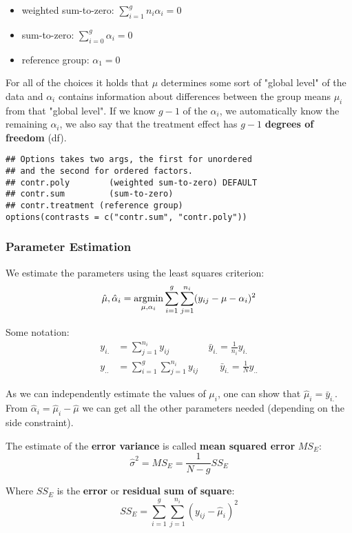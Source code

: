 \begin{itemize}
	\item weighted sum-to-zero: $\sum_{i=1}^{g} n_i \alpha_i = 0$
	\item sum-to-zero: $\sum_{i=0}^g \alpha_i = 0$
	\item reference group: $\alpha_1 = 0$
\end{itemize}

For all of the choices it holds that $\mu$ determines some sort of "global level" of the data and $\alpha_i$ contains information about differences between the group means $\mu_i$ from that "global level". If we know $g-1$ of the $\alpha_i$, we automatically know the remaining $\alpha_i$, we also say that the treatment effect has $g-1$ \textbf{degrees of freedom} (df).

\begin{lstlisting}
## Options takes two args, the first for unordered 
## and the second for ordered factors.
## contr.poly        (weighted sum-to-zero) DEFAULT
## contr.sum         (sum-to-zero)
## contr.treatment (reference group)
options(contrasts = c("contr.sum", "contr.poly"))
\end{lstlisting}

\subsubsection{Parameter Estimation}

We estimate the parameters using the least squares criterion:
$$\hat \mu, \hat \alpha_i = \underset{\mu, \alpha_i}{\text{argmin}} \sum_{i=1}^g \sum_{j=1}^{n_i}(y_{ij} - \mu - \alpha_i)^2$$

Some notation:
\begin{align*}
	y_{i.} &= \sum_{j=1}^{n_i}y_{ij} 			  \qquad \qquad  \bar y_{i.} = \frac{1}{n_i}y_{i.}\\
	y_{..} &= \sum_{i=1}^g \sum_{j=1}^{n_i}y_{ij} \qquad \ \bar y_{i.} = \frac{1}{N} y_{..}
\end{align*}

As we can independently estimate the values of $\mu_i$, one can show that $\hat \mu_i = \bar y_{i.}$. From $\hat \alpha_i = \hat \mu_i - \hat \mu$ we can get all the other parameters needed (depending on the side constraint). \medskip

The estimate of the \textbf{error variance} is called \textbf{mean squared error} $MS_E$:
$$\hat \sigma^2 = MS_E = \frac{1}{N - g} SS_E$$

Where $SS_E$ is the \textbf{error} or \textbf{residual sum of square}:
$$SS_E = \sum_{i=1}^g \sum_{j=1}^{n_i}(y_{ij} - \hat \mu_i)^2$$

